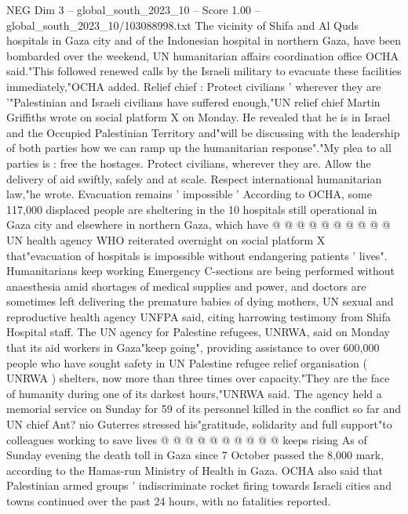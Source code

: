 \begin{textsample}{NEG Dim 3 – global\_south\_2023\_10 – Score 1.00 – global\_south\_2023\_10/103088998.txt}  \label{ex:f3_neg_024}
The vicinity of Shifa and Al Quds hospitals in Gaza city and of the Indonesian hospital in northern Gaza, have been bombarded over the weekend, UN humanitarian affairs coordination office OCHA said."This followed renewed calls by the Israeli military to evacuate these facilities immediately,"OCHA added.
Relief chief : Protect civilians ' wherever they are '"Palestinian and Israeli civilians have suffered enough,"UN relief chief Martin Griffiths wrote on social platform X on Monday.
He revealed that he is in Israel and the Occupied Palestinian Territory and"will be discussing with the leadership of both parties how we can ramp up the humanitarian response"."My plea to all parties is : free the hostages.
Protect civilians, wherever they are.
Allow the delivery of aid swiftly, safely and at scale.
Respect international humanitarian law,"he wrote.
Evacuation remains ' impossible ' According to OCHA, some 117,000 displaced people are sheltering in the 10 hospitals still operational in Gaza city and elsewhere in northern Gaza, which have @ @ @ @ @ @ @ @ @ @ UN health agency WHO reiterated overnight on social platform X that"evacuation of hospitals is impossible without endangering patients ' lives".
Humanitarians keep working Emergency C-sections are being performed without anaesthesia amid shortages of medical supplies and power, and doctors are sometimes left delivering the premature babies of dying mothers, UN sexual and reproductive health agency UNFPA said, citing harrowing testimony from Shifa Hospital staff.
The UN agency for Palestine refugees, UNRWA, said on Monday that its aid workers in Gaza"keep going", providing assistance to over 600,000 people who have sought safety in UN Palestine refugee relief organisation ( UNRWA ) shelters, now more than three times over capacity."They are the face of humanity during one of its darkest hours,"UNRWA said.
The agency held a memorial service on Sunday for 59 of its personnel killed in the conflict so far and UN chief Ant? nio Guterres stressed his"gratitude, solidarity and full support"to colleagues working to save lives @ @ @ @ @ @ @ @ @ @ keeps rising As of Sunday evening the death toll in Gaza since 7 October passed the 8,000 mark, according to the Hamas-run Ministry of Health in Gaza.
OCHA also said that Palestinian armed groups ' indiscriminate rocket firing towards Israeli cities and towns continued over the past 24 hours, with no fatalities reported.

\end{textsample}
